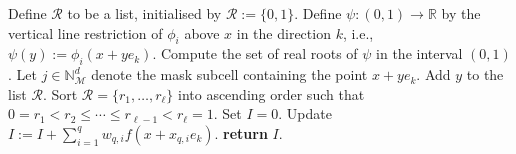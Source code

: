 \documentclass[onefignum,onetabnum,onealgnum,oneeqnum]{siamart190516}
\newcommand{\R}{\mathbb R}
\newcommand{\circint}{\mathop{\mathpalette\docircint\relax}\!\int}
\newcommand{\docircint}[2]{%
  \ifx#1\displaystyle
    \displaycircint
  \else
    \normalcircint{#1}%
  \fi
}
\newcommand{\displaycircint}{\rotatebox{-11}{\scalebox{1.5}{$\diamond$}}\mkern-19mu}
\newcommand{\normalcircint}[1]{\smallerc{#1}\ifx#1\textstyle\mkern-11.1mu\else\mkern-10.6mu\fi}
\newcommand{\smallerc}[1]{\vcenter{\hbox{\rotatebox{-9}{\scalebox{\ifx#1\textstyle 1\else 0.75\fi}{$\diamond$}}}}}
\begin{document}
\begin{algorithm}[t]
\caption{\small Compute $\mathcal{F}_\mathsf{eval}(x; k, f, \{(\phi_i, m_i)\}_{i=1}^n, q)$. Given a point $x \in \R^{d-1}$, a height direction $k$, a function $f : \R^d \to \R$, a list of multivariate polynomials $\phi_i : (0,1)^d \to \R$ and associated masks $m_i : {\mathbb N}_{\mathcal M}^d \to \{0,1\}$, and the order of quadrature $q$, approximate the one-dimensional integral $\circint_{(0,1) \setminus \Gamma(x)} f(x + y e_k)\,dy$, where $\Gamma(x) := \bigcup_i \{y : 0 \leq y \leq 1 \text{ and } \phi_i(x + ye_k) = 0\}$.}
\label{algo:integrand}
\begin{algorithmic}[1]
	\State Define $\mathcal R$ to be a list, initialised by $\mathcal R := \{0, 1\}$.
		\State Define $\psi: (0,1) \to \R$ by the vertical line restriction of $\phi_i$ above $x$ in the direction $k$, i.e., $\psi(y) := \phi_i(x + y e_k)$.
		\State Compute the set of real roots of $\psi$ in the interval $(0,1)$.
			\State Let $j \in {\mathbb N}_{\mathcal M}^d$ denote the mask subcell containing the point $x + y e_k$.
				\State Add $y$ to the list $\mathcal R$.
			\EndIf
		\EndFor
	\EndFor
	\State Sort $\mathcal R = \{r_1, \ldots, r_\ell\}$ into ascending order such that $0 = r_1 < r_2 \leq \cdots \leq r_{\ell - 1} < r_\ell = 1$.
	\State Set $I = 0$.
			\State Update $I := I + \sum_{i=1}^q w_{q,i} f(x + x_{q,i} e_k)$.
		\EndIf
	\EndFor
	\State \textbf{return} $I$.
	\end{algorithmic}
\end{algorithm}
\end{document}
